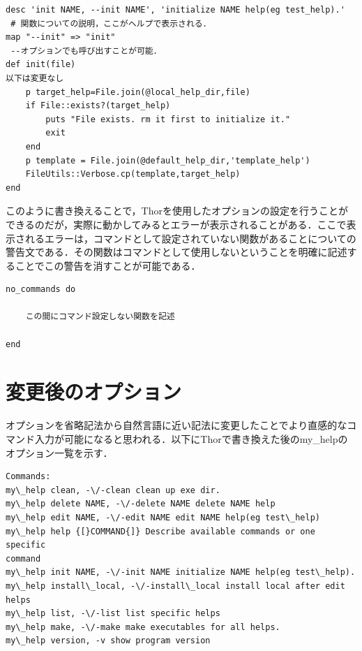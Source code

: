 \begin{screen}
{\small
\begin{verbatim}
desc 'init NAME, --init NAME', 'initialize NAME help(eg test_help).'
 # 関数についての説明，ここがヘルプで表示される．
map "--init" => "init"
 --オプションでも呼び出すことが可能．
def init(file)
以下は変更なし
    p target_help=File.join(@local_help_dir,file)
    if File::exists?(target_help)
        puts "File exists. rm it first to initialize it."
        exit
    end
    p template = File.join(@default_help_dir,'template_help')
    FileUtils::Verbose.cp(template,target_help)
end
\end{verbatim}}
\end{screen}

このように書き換えることで，Thorを使用したオプションの設定を行うことができるのだが，実際に動かしてみるとエラーが表示されることがある．ここで表示されるエラーは，コマンドとして設定されていない関数があることについての警告文である．その関数はコマンドとして使用しないということを明確に記述することでこの警告を消すことが可能である．

\begin{screen}
{\small
\begin{verbatim}
no_commands do

    この間にコマンド設定しない関数を記述

end
\end{verbatim}}
\end{screen}

\section{変更後のオプション}\label{}

オプションを省略記法から自然言語に近い記法に変更したことでより直感的なコマンド入力が可能になると思われる．以下にThorで書き換えた後のmy\_helpのオプション一覧を示す．

\begin{screen}
{\small
\begin{verbatim}
Commands:
my\_help clean, -\/-clean clean up exe dir.
my\_help delete NAME, -\/-delete NAME delete NAME help
my\_help edit NAME, -\/-edit NAME edit NAME help(eg test\_help)
my\_help help {[}COMMAND{]} Describe available commands or one specific
command
my\_help init NAME, -\/-init NAME initialize NAME help(eg test\_help).
my\_help install\_local, -\/-install\_local install local after edit
helps
my\_help list, -\/-list list specific helps
my\_help make, -\/-make make executables for all helps.
my\_help version, -v show program version
\end{verbatim}}
\end{screen}
    